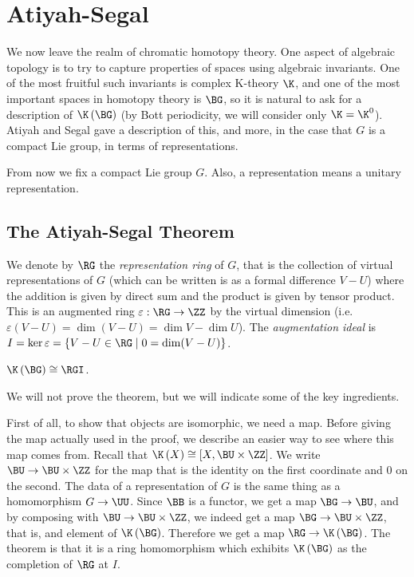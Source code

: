 \section{Atiyah-Segal}

We now leave the realm of chromatic homotopy theory.
One aspect of algebraic topology is to try to capture properties of spaces using algebraic invariants.
One of the most fruitful such invariants is complex K-theory $\K$, and one of the most important spaces in homotopy theory is $\BG$, so it is natural to ask for a description of $\K\left(\BG\right)$ (by Bott periodicity, we will consider only $\K = \K^0$).
Atiyah and Segal \cite{AS} gave a description of this, and more, in the case that $G$ is a compact Lie group, in terms of representations.

From now we fix a compact Lie group $G$.
Also, a representation means a unitary representation.

\subsection{The Atiyah-Segal Theorem}

We denote by $\RG$ the \emph{representation ring} of $G$, that is the collection of virtual representations of $G$ (which can be written is as a formal difference $V - U$) where the addition is given by direct sum and the product is given by tensor product.
This is an augmented ring $\varepsilon: \RG \to \ZZ$ by the virtual dimension (i.e. $\varepsilon\left(V-U\right) = \dim\left(V-U\right) = \dim V - \dim U$).
The \emph{augmentation ideal} is $I = \ker \varepsilon = \left\{ V - U \in \RG \mid 0 = \dim(V-U) \right\}$.

\begin{theorem}[{\cite{AS}}]
	$\K\left(\BG\right) \cong \RGI$.
\end{theorem}

We will not prove the theorem, but we will indicate some of the key ingredients.

First of all, to show that objects are isomorphic, we need a map.
Before giving the map actually used in the proof, we describe an easier way to see where this map comes from.
Recall that $\K\left(X\right) \cong \left[X, \BU \times \ZZ\right]$.
We write $\BU \to \BU \times \ZZ$ for the map that is the identity on the first coordinate and $0$ on the second.
The data of a representation of $G$ is the same thing as a homomorphism $G \to \UU$.
Since $\BB$ is a functor, we get a map $\BG \to \BU$, and by composing with $\BU \to \BU \times \ZZ$, we indeed get a map $\BG \to \BU \times \ZZ$, that is, and element of $\K\left(\BG\right)$.
Therefore we get a map $\RG \to \K\left(\BG\right)$.
The theorem is that it is a ring homomorphism which exhibits $\K\left(\BG\right)$ as the completion of $\RG$ at $I$.

